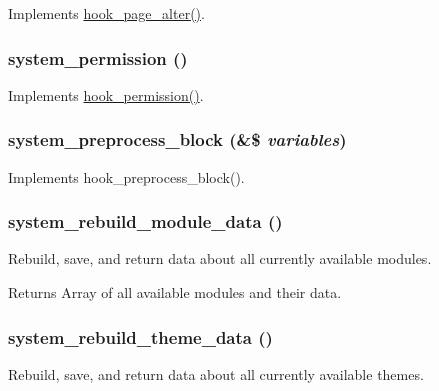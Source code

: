 \label{system_8module_accbb83043437c6d64b3c11d32104459e}
Implements \hyperlink{group__hooks_gaa965aa8f38b48aed1a19c556c199145f}{hook\_\-page\_\-alter()}. \hypertarget{system_8module_a21ecb659e6aa944c6c85ad0b50dcbb0e}{
\subsubsection[{system\_\-permission}]{\setlength{\rightskip}{0pt plus 5cm}system\_\-permission ()}}
\label{system_8module_a21ecb659e6aa944c6c85ad0b50dcbb0e}
Implements \hyperlink{group__hooks_ga2b22b45f4925f2478412477bae329713}{hook\_\-permission()}. \hypertarget{system_8module_a32befafe4460ad324666b282350deb02}{
\subsubsection[{system\_\-preprocess\_\-block}]{\setlength{\rightskip}{0pt plus 5cm}system\_\-preprocess\_\-block (\&\$ {\em variables})}}
\label{system_8module_a32befafe4460ad324666b282350deb02}
Implements hook\_\-preprocess\_\-block(). \hypertarget{system_8module_a2c3c848bc7c14d6f770a2f8df8f35332}{
\subsubsection[{system\_\-rebuild\_\-module\_\-data}]{\setlength{\rightskip}{0pt plus 5cm}system\_\-rebuild\_\-module\_\-data ()}}
\label{system_8module_a2c3c848bc7c14d6f770a2f8df8f35332}
Rebuild, save, and return data about all currently available modules.

\begin{DoxyReturn}{Returns}
Array of all available modules and their data. 
\end{DoxyReturn}
\hypertarget{system_8module_a702e05f2ab6d4ac7e8be5b0e07afa701}{
\subsubsection[{system\_\-rebuild\_\-theme\_\-data}]{\setlength{\rightskip}{0pt plus 5cm}system\_\-rebuild\_\-theme\_\-data ()}}
\label{system_8module_a702e05f2ab6d4ac7e8be5b0e07afa701}
Rebuild, save, and return data about all currently available themes.

